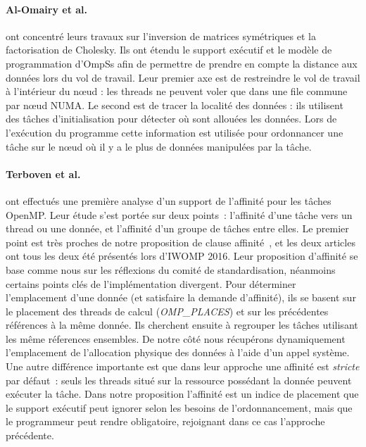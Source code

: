 \paragraph{Al-Omairy et al.~\cite{Al-Omairy2015}} ont concentré leurs travaux sur l'inversion de matrices symétriques et la factorisation de Cholesky.
Ils ont étendu le support exécutif et le modèle de programmation d'OmpSs afin de permettre de prendre en compte la distance aux données lors du vol de travail.
Leur premier axe est de restreindre le vol de travail à l'intérieur du nœud : les threads ne peuvent voler que dans une file commune par nœud NUMA.
Le second est de tracer la localité des données : ils utilisent des tâches d'initialisation pour détecter où sont allouées les données. Lors de l'exécution du programme cette information est utilisée pour ordonnancer une tâche sur le nœud où il y a le plus de données manipulées par la tâche.


\paragraph{Terboven et al.~\cite{Terboven2016}} ont effectués une première analyse d'un support de l'affinité pour les tâches OpenMP.
Leur étude s'est portée sur deux points~: l'affinité d'une tâche vers un thread ou une donnée, et l'affinité d'un groupe de tâches entre elles.
Le premier point est très proches de notre proposition de clause affinité~\cite{Virouleau2016b}, et les deux articles ont tous les deux été présentés lors d'IWOMP 2016.
Leur proposition d'affinité se base comme nous sur les réflexions du comité de standardisation, néanmoins certains points clés de l'implémentation divergent.
Pour déterminer l'emplacement d'une donnée (et satisfaire la demande d'affinité), ils se basent sur le placement des threads de calcul (\emph{OMP\_PLACES}) et sur les précédentes références à la même donnée. Ils cherchent ensuite à regrouper les tâches utilisant les même réferences ensembles.
De notre côté nous récupérons dynamiquement l'emplacement de l'allocation physique des données à l'aide d'un appel système.
Une autre différence importante est que dans leur approche une affinité est \emph{stricte} par défaut~: seuls les threads situé sur la ressource possédant la donnée peuvent exécuter la tâche.
Dans notre proposition l'affinité est un indice de placement que le support exécutif peut ignorer selon les besoins de l'ordonnancement, mais que le programmeur peut rendre obligatoire, rejoignant dans ce cas l'approche précédente.


